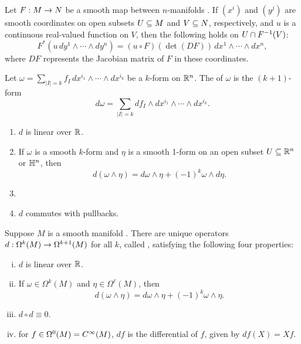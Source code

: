 \setcounter{thm}{19}

\begin{prop}
Let $F:M\rightarrow N$ be a smooth map between $n$-manifolds \wowob. If $(x^i)$ and $(y^j)$ are smooth coordinates on open subsets $U\subseteq M$ and $V\subseteq N$, respectively, and $u$ is a continuous real-valued function on $V$, then the following holds on $U\cap F^{-1}(V)$:
\[F^*(u\,dy^1\wedge\cdots\wedge dy^n) =(u\circ F)(\det(DF))\,dx^1\wedge\cdots\wedge dx^n,\]
where $DF$ represents the Jacobian matrix of $F$ in these coordinates.
\end{prop}

\dfn Let $\omega = \sum_{|I| = k} f_I\, dx^{i_1}\wedge\cdots\wedge dx^{i_k}$ be a $k$-form on $\mathbb{R}^n$. The  of $\omega$ is the $(k + 1)$-form
\[d\omega = \sum_{|I| = k} df_I\wedge dx^{i_1}\wedge\cdots\wedge dx^{i_k}.\]

\setcounter{thm}{22}

\begin{prop}\nl
\begin{enumerate}
    \item $d$ is linear over $\mathbb{R}$.
    \item If $\omega$ is a smooth $k$-form and $\eta$ is a smooth 1-form on an open subset $U\subseteq \mathbb{R}^n$ or $\mathbb{H}^n$, then
    \[d(\omega\wedge\eta) = d\omega\wedge\eta + (-1)^k\omega\wedge d\eta.\]
    \item {}
    \item $d$ commutes with pullbacks.
\end{enumerate}
\end{prop}

\begin{thm}
Suppose $M$ is a smooth manifold \wowob. There are unique operators $d:\Omega^k(M)\rightarrow \Omega^{k + 1}(M)$ for all $k$, called , satisfying the following four properties:
\begin{enumerate}[(i)]
    \item $d$ is linear over $\mathbb{R}$.
    \item If $\omega\in\Omega^k(M)$ and $\eta \in \Omega^\ell(M)$, then
    \[d(\omega\wedge\eta) = d\omega\wedge\eta + (-1)^k\omega\wedge\eta.\]
    \item $d\circ d \equiv 0$.
    \item for $f\in \Omega^0(M) = C^\infty(M)$, $df$ is the differential of $f$, given by $df(X) = Xf$.
\end{enumerate}
\end{thm}

